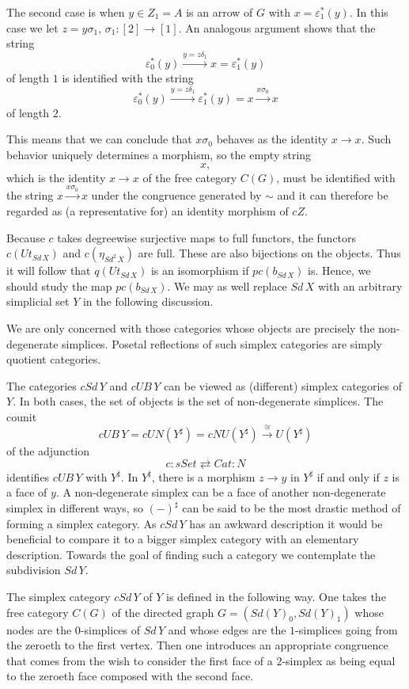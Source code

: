 The second case is when $y\in Z_1=A$ is an arrow of $G$ with $x=\varepsilon _1^*(y)$. In this case we let $z=y\sigma _1$, $\sigma _1:[2]\to [1]$. An analogous argument shows that the string
\[\varepsilon ^*_0(y)\xrightarrow{y=z\delta _1} x=\varepsilon ^*_1(y)\]
of length $1$ is identified with the string
\[\varepsilon ^*_0(y)\xrightarrow{y=z\delta _1} \varepsilon ^*_1(y)=x\xrightarrow{x\sigma _0} x\]
of length $2$.

This means that we can conclude that $x\sigma _0$ behaves as the identity $x\to x$. Such behavior uniquely determines a morphism, so the empty string
\[x,\]
which is the identity $x\to x$ of the free category $C(G)$, must be identified with the string $x\xrightarrow{x\sigma _0} x$ under the congruence generated by $\sim$ and it can therefore be regarded as (a representative for) an identity morphism of $cZ$.




Because $c$ takes degreewise surjective maps to full functors, the functors $c(Ut_{Sd\, X})$ and $c(\eta _{Sd^2\, X})$ are full. These are also bijections on the objects. Thus it will follow that $q(Ut_{Sd\, X})$ is an isomorphism if $pc(b_{Sd\, X})$ is. Hence, we should study the map $pc(b_{Sd\, X})$. We may as well replace $Sd\, X$ with an arbitrary simplicial set $Y$ in the following discussion.



We are only concerned with those categories whose objects are precisely the non-degenerate simplices. Posetal reflections of such simplex categories are simply quotient categories.

The categories $cSd\, Y$ and $cUB\, Y$ can be viewed as (different) simplex categories of $Y$. In both cases, the set of objects is the set of non-degenerate simplices. The counit
\[cUB\, Y=cUN(Y^\sharp )=cNU(Y^\sharp )\xrightarrow{\cong} U(Y^\sharp )\]
of the adjunction
\[c:sSet\rightleftarrows Cat:N\]
identifies $cUB\, Y$ with $Y^\sharp$. In $Y^\sharp$, there is a morphism $z\to y$ in $Y^\sharp$ if and only if $z$ is a face of $y$. A non-degenerate simplex can be a face of another non-degenerate simplex in different ways, so $(-)^\sharp$ can be said to be the most drastic method of forming a simplex category. As $cSd\, Y$ has an awkward description it would be beneficial to compare it to a bigger simplex category with an elementary description. Towards the goal of finding such a category we contemplate the subdivision $Sd\, Y$.

The simplex category $cSd\, Y$ of $Y$ is defined in the following way. One takes the free category $C(G)$ of the directed graph $G=(Sd(Y)_0,Sd(Y)_1)$ whose nodes are the $0$-simplices of $Sd\, Y$ and whose edges are the $1$-simplices going from the zeroeth to the first vertex. Then one introduces an appropriate congruence that comes from the wish to consider the first face of a $2$-simplex as being equal to the zeroeth face composed with the second face.

